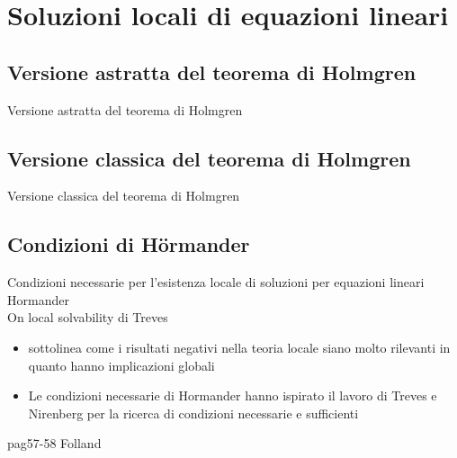 \chapter{Soluzioni locali di equazioni lineari}

\section{Versione astratta del teorema di Holmgren}
Versione astratta del teorema di Holmgren
\section{Versione classica del teorema di Holmgren}
Versione classica del teorema di Holmgren
\section{Condizioni di Hörmander}\label{Hormander}
Condizioni necessarie per l'esistenza locale di soluzioni per equazioni lineari\\
Hormander\\
On local solvability di Treves
\begin{itemize}
\item
sottolinea come i risultati negativi nella teoria locale siano molto rilevanti 
in quanto hanno implicazioni globali
\item
Le condizioni necessarie di Hormander hanno ispirato il lavoro di Treves e Nirenberg per la ricerca 
di condizioni necessarie e sufficienti
\end{itemize}

pag57-58 Folland
